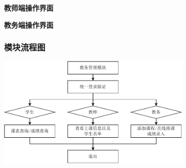 \documentclass{article}
\begin{document}
\begin{center}
\textbf{教师端操作界面}
\end{center}

\begin{center}
\textbf{教务端操作界面}
\end{center}

\subsubsection{模块流程图}

\begin{center}
\includegraphics[width=0.7\textwidth]{fig/affair-flowchart.pdf}
\end{center}
\end{document}
